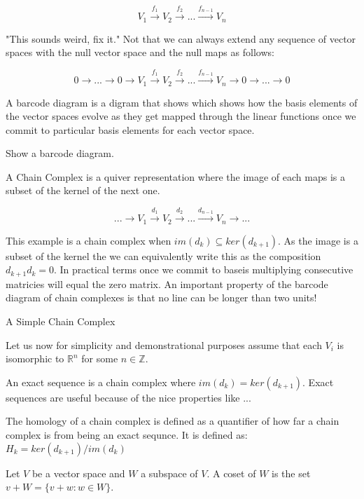 $$V_1 \overset{f_1}{\longrightarrow} V_2 \overset{f_2}{\longrightarrow} ... \overset{f_{n-1}}{\longrightarrow} V_n  $$


"This sounds weird, fix it."
Not that we can always extend any sequence of vector spaces with the null vector space and the null maps as follows:

$$ 0 \longrightarrow ... \longrightarrow 0 \longrightarrow V_1 \overset{f_1}{\longrightarrow} V_2 \overset{f_2}{\longrightarrow} ... \overset{f_{n-1}}{\longrightarrow} V_n  \longrightarrow 0 \longrightarrow ... \longrightarrow 0$$

A barcode diagram is a digram that shows which shows how the basis elements of the vector spaces evolve as they get mapped through the linear functions once we commit to particular basis elements for each vector space.

Show a barcode diagram.

A Chain Complex is a quiver representation where the image of each maps is a subset of the kernel of the next one.

$$ ... \longrightarrow V_1 \overset{d_1}{\longrightarrow} V_2 \overset{d_2}{\longrightarrow} ... \overset{d_{n-1}}{\longrightarrow} V_n  \longrightarrow ... $$

This example is a chain complex when $im(d_k) \subseteq ker(d_{k+1})$. As the image is a subset of the kernel the we can equivalently write this as the composition $d_{k+1}d_k = 0$. In practical terms once we commit to baseis multiplying consecutive matricies will equal the zero matrix. An important property of the barcode diagram of chain complexes is that no line can be longer than two units!


\begin{ex}  A Simple Chain Complex \end{ex}
Let us now for simplicity and demonstrational purposes assume that each $V_i$ is isomorphic to $\mathbb{R}^n$ for some $n \in \mathbb{Z}$.


An exact sequence is a chain complex where $im(d_k) = ker(d_{k+1})$. Exact sequences are useful because of the nice properties like ...

The homology of a chain complex is defined as a quantifier of how far a chain complex is from being an exact sequnce. It is defined as: $ H_k = ker(d_{k+1}) / im(d_k) $

Let $V$ be a vector space and $W$ a subspace of $V$. A coset of $W$ is the set $v + W = \{v + w : w \in W\}$.

